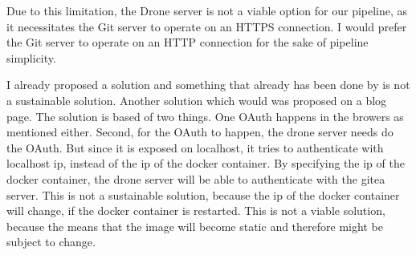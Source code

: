 Due to this limitation, the Drone server is not a viable option for our pipeline, as it 
necessitates the Git server to operate on an HTTPS connection. I would prefer the Git server 
to operate on an HTTP connection for the sake of pipeline simplicity.

I already proposed a solution and something that already has been done by is not a sustainable solution. 
Another solution which would was proposed on a blog page\cite{drone-solution-static-ip}. The solution is based of 
two things. One OAuth happens in the browers as mentioned either. Second, for the OAuth to happen, the drone 
server needs do the OAuth. But since it is exposed on localhost, it tries to authenticate with localhost ip, 
instead of the ip of the docker container. By specifying the ip of the docker container, the drone server will
be able to authenticate with the gitea server. This is not a sustainable solution, because the ip of the docker container
will change, if the docker container is restarted. This is not a viable solution, because the means that the image 
will become static and therefore might be subject to change.
